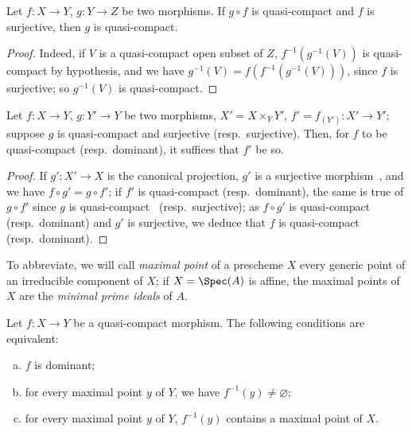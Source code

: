 \begin{proposition}[1.1.3]
\label{IV.1.1.3}
Let $f:X\to Y$, $g:Y\to Z$ be two morphisms. If $g\circ f$ is quasi-compact and $f$ is surjective, then $g$ is quasi-compact.
\end{proposition}

\begin{proof}
Indeed, if $V$ is a quasi-compact open subset of $Z$, $f^{-1}(g^{-1}(V))$ is quasi-compact
by hypothesis, and we have $g^{-1}(V)=f(f^{-1}(g^{-1}(V)))$, since $f$ is surjective; so $g^{-1}(V)$
is quasi-compact.
\end{proof}

\begin{corollary}[1.1.4]
\label{IV.1.1.4}
Let $f:X\to Y$, $g:Y'\to Y$ be two morphisms, $X'=X\times_Y Y'$,
$f'=f_{(Y')}:X'\to Y'$; suppose $g$ is quasi-compact and surjective \textnormal{(}resp.\ surjective\textnormal{)}. Then, for $f$ to be
quasi-compact \textnormal{(}resp.\ dominant\textnormal{)}, it suffices that $f'$ be so.
\end{corollary}

\begin{proof}
If $g':X'\to X$ is the canonical projection, $g'$ is a surjective morphism~,
and we have $f\circ g'=g\circ f'$; if $f'$ is quasi-compact (resp.\ dominant), the same is true of $g\circ f'$
since $g$ is quasi-compact~ (resp.\ surjective); as $f\circ g'$ is quasi-compact
(resp.\ dominant) and $g'$ is surjective, we deduce that $f$ is quasi-compact~
(resp.\ dominant).
\end{proof}


To abbreviate, we will call \emph{maximal point} of a prescheme $X$ every generic point
of an irreducible component of $X$; if $X=\Spec(A)$ is affine, the maximal points
of $X$ are the \emph{minimal prime ideals} of $A$.

\begin{proposition}[1.1.5]
\label{IV.1.1.5}
Let $f:X\to Y$ be a quasi-compact morphism. The following
conditions are equivalent:
\begin{enumerate}[a)]
  \item $f$ is dominant;
  \item for every maximal point $y$ of $Y$, we have $f^{-1}(y)\neq\varnothing$;
  \item for every maximal point $y$ of $Y$, $f^{-1}(y)$ contains a maximal point of $X$.
\end{enumerate}
\end{proposition}


